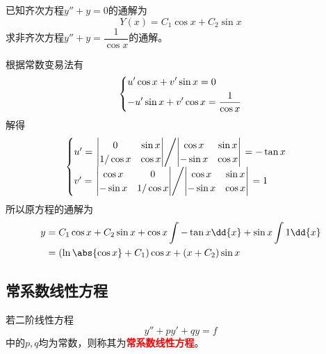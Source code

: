 \begin{example}
    已知齐次方程$y''+y=0$的通解为
    \[ Y(x) = C_1\cos x + C_2\sin x \]
    求非齐次方程$y''+y = \dfrac{1}{\cos x}$的通解。
\end{example}
\begin{solution}
    根据常数变易法有
    \[
        \begin{dcases}
            u'\cos x + v'\sin x = 0 \\
            -u'\sin x + v'\cos x = \frac{1}{\cos x}
        \end{dcases}
    \]
    解得
    \[
        \begin{cases}
            u' =
            \left.
            \begin{vmatrix}
                0        & \sin x \\
                1/\cos x & \cos x
            \end{vmatrix}
            \middle/
            \begin{vmatrix}
                \cos x  & \sin x \\
                -\sin x & \cos x
            \end{vmatrix}
            \right.
            = -\tan x
            \\
            v' =
            \left.
            \begin{vmatrix}
                \cos x  & 0        \\
                -\sin x & 1/\cos x
            \end{vmatrix}
            \middle/
            \begin{vmatrix}
                \cos x  & \sin x \\
                -\sin x & \cos x
            \end{vmatrix}
            \right.
            = 1
        \end{cases}
    \]
    所以原方程的通解为
    \begin{align*}
        y & = C_1\cos x + C_2\sin x + \cos x\int -\tan x \dd{x} + \sin x\int 1\dd{x} \\
          & = (\ln\abs{\cos x}+C_1)\cos x + (x+C_2)\sin x
    \end{align*}
\end{solution}

\subsection{常系数线性方程}
若二阶线性方程
\[ y'' + py' + qy = f \]
中的$p,q$均为常数，则称其为\textcolor{red}{\textbf{\textsf{常系数线性方程}}}。
